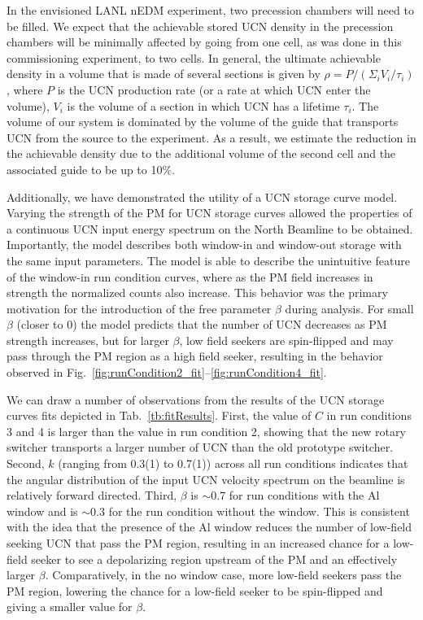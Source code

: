In the envisioned LANL nEDM experiment, two precession chambers will need to be filled. We expect that the achievable stored UCN density in the precession chambers will be minimally affected by going from one cell, as was done in this commissioning experiment, to two cells. In general, the ultimate achievable density in a volume that is made of several sections is given by $\rho = P/(\Sigma_i V_i/\tau_i)$, where $P$ is the UCN production rate (or a rate at which UCN enter the volume), $V_i$ is the volume of a section in which UCN has a lifetime $\tau_i$.  The volume of our system is dominated by the volume of the guide that transports UCN from the source to the experiment. As a result, we estimate the reduction in the achievable density due to the additional volume of the second cell and the associated guide to be up to 10\%. 

Additionally, we have demonstrated the utility of a UCN storage curve model. Varying the strength of the PM for UCN storage curves allowed the properties of a continuous UCN input energy spectrum on the North Beamline to be obtained. Importantly, the model describes both window-in and window-out storage with the same input parameters. The model is able to describe the unintuitive feature of the window-in run condition curves, where as the PM field increases in strength the normalized counts also increase. This behavior was the primary motivation for the introduction of the free parameter $\beta$ during analysis. For small $\beta$ (closer to 0) the model predicts that the number of UCN decreases as PM strength increases, but for larger $\beta$, low field seekers are spin-flipped and may pass through the PM region as a high field seeker, resulting in the behavior observed in Fig.~\ref{fig:runCondition2_fit}--\ref{fig:runCondition4_fit}.

We can draw a number of observations from the results of the UCN storage curves fits depicted in Tab.~\ref{tb:fitResults}. First, the value of $C$ in run conditions 3 and 4 is larger than the value in run condition 2, showing that the new rotary switcher transports a larger number of UCN than the old prototype switcher. Second, $k$ (ranging from 0.3(1) to 0.7(1)) across all run conditions indicates that the angular distribution of the input UCN velocity spectrum on the beamline is relatively forward directed. Third, $\beta$ is $\sim 0.7$ for run conditions with the Al window and is $\sim 0.3$ for the run condition without the window. This is consistent with the idea that the presence of the Al window reduces the number of low-field seeking UCN that pass the PM region, resulting in an increased chance for a low-field seeker to see a depolarizing region upstream of the PM and an effectively larger $\beta$. Comparatively, in the no window case, more low-field seekers pass the PM region, lowering the chance for a low-field seeker to be spin-flipped and giving a smaller value for $\beta$. 

